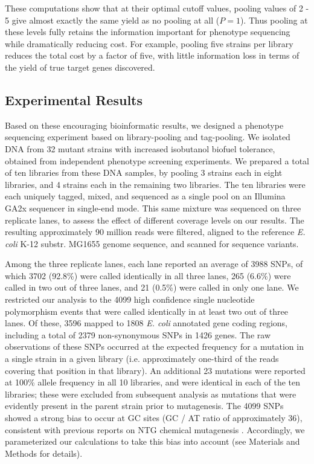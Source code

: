 \documentclass[letterpaper,10pt,english]{howto}
\begin{document}
These computations show that at their optimal cutoff values, pooling
values of 2 - 5 give almost exactly the same yield as no
pooling at all ($P=1$).  Thus pooling at these levels
fully retains the information important for phenotype sequencing while dramatically reducing cost.  For example,
pooling five strains per library reduces the total cost
by a factor of five, with little information loss
in terms of the yield of true target genes discovered.


\subsection{Experimental Results}

Based on these encouraging bioinformatic results, we designed
a phenotype sequencing experiment based on library-pooling and tag-pooling.
We isolated DNA from 32 mutant strains with increased isobutanol
biofuel tolerance, obtained from independent phenotype screening
experiments.  We prepared a total of ten libraries from these DNA
samples, by pooling 3 strains each in eight libraries, and 4 strains
each in the remaining two libraries.  The ten libraries were each
uniquely tagged, mixed, and sequenced
as a single pool on an Illumina GA2x sequencer in single-end mode.
This same mixture was sequenced on three replicate lanes, to assess
the effect of different coverage levels on our results.
The resulting approximately 90 million reads were filtered, aligned to the
reference \emph{E. coli} K-12 substr. MG1655 genome sequence, and
scanned for sequence variants.

Among the three replicate lanes, each lane
reported an average of 3988 SNPs, of which 3702 (92.8\%)
were called identically in all three lanes, 265 (6.6\%) were
called in two out of three lanes, and 21 (0.5\%)
were called in only one lane.
We restricted our analysis to the 4099 high confidence single nucleotide
polymorphism events that were called identically
in at least two out of three lanes.
Of these, 3596 mapped to 1808 \emph{E. coli}
annotated gene coding regions,
including a total of 2379 non-synonymous SNPs in 1426 genes.  The
raw observations of these SNPs occurred at the expected frequency
for a mutation in a single strain in a given library (i.e.
approximately one-third of the reads covering that position in
that library).  An additional 23 mutations
were reported at 100\% allele frequency in all 10 libraries, and
were identical in each of the ten libraries; these were excluded
from subsequent analysis as mutations that were evidently present
in the parent strain prior to mutagenesis.  The 4099 SNPs showed
a strong bias to occur at GC sites (GC / AT ratio of approximately 36),
consistent with previous reports on NTG chemical mutagenesis
\cite{Ohnishi2008} .
Accordingly, we parameterized our calculations to take this
bias into account (see Materials and Methods for details).
\end{document}
